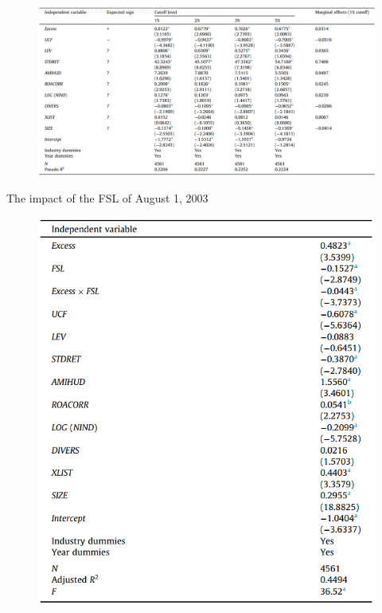 \documentclass{beamer}
\begin{document}
\begin{frame}
	\begin{figure}
		\centering
		\includegraphics[width=\linewidth]{t6}
		\label{fig:t6}
	\end{figure}
\end{frame}

\begin{frame}{The impact of the FSL of August 1, 2003}
		\begin{figure}
		\centering
		\includegraphics[width=0.7\textheight]{t8}
		\label{fig:t8}
	\end{figure}
\end{frame}
\end{document}
